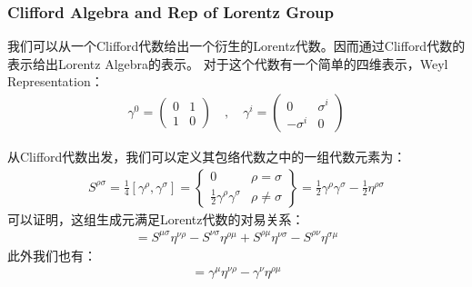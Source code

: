 \subsubsection{Clifford Algebra and Rep of Lorentz Group}

\bigskip
{}

我们可以从一个Clifford代数给出一个衍生的Lorentz代数。因而通过Clifford代数的表示给出Lorentz Algebra的表示。
对于这个代数有一个简单的四维表示，Weyl Representation：
\begin{align}
  \gamma^{0}=\begin{pmatrix}0&1\\1&0\end{pmatrix}\quad,\quad\gamma^{i}=\begin{pmatrix}0&\sigma^{i}\\-\sigma^{i}&0\end{pmatrix}
\end{align}

\bigskip
{}

从Clifford代数出发，我们可以定义其包络代数之中的一组代数元素为：
\begin{align}
  S^{\rho\sigma}=\frac{1}{4}\left[\gamma^{\rho},\gamma^{\sigma}\right]=\begin{Bmatrix}0&\rho=\sigma\\\frac{1}{2}\gamma^{\rho}\gamma^{\sigma}&\rho\neq\sigma\end{Bmatrix}=\frac{1}{2}\gamma^{\rho}\gamma^{\sigma}-\frac{1}{2}\eta^{\rho\sigma}
\end{align}
可以证明，这组生成元满足Lorentz代数的对易关系：
\begin{align}
 [S^{\mu\nu},S^{\rho\sigma}]=S^{\mu\sigma}\eta^{\nu\rho}-S^{\nu\sigma}\eta^{\rho\mu}+S^{\rho\mu}\eta^{\nu\sigma}-S^{\rho\nu}\eta^{\sigma\mu} 
\end{align}
此外我们也有：
\begin{align}
  [S^{\mu\nu},\gamma^{\rho}]=\gamma^{\mu}\eta^{\nu\rho}-\gamma^{\nu}\eta^{\rho\mu}
\end{align}

